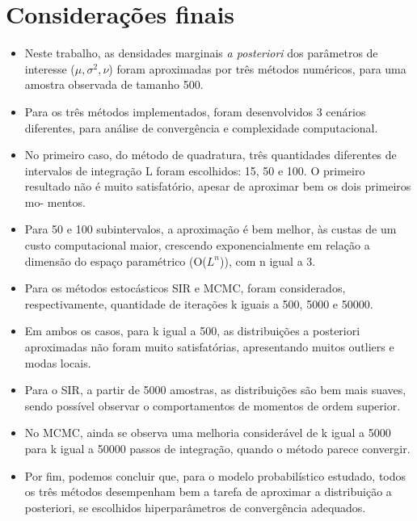 \documentclass[9pt]{beamer}
\begin{document}
\section{Considerações finais}
\begin{frame}
\begin{itemize}
\justifying	
\item Neste trabalho, as densidades marginais \textit{a posteriori} dos parâmetros de interesse ($\mu, \sigma^2, \nu$) foram aproximadas por três métodos numéricos, para uma amostra observada de tamanho 500.
\item Para os três métodos implementados, foram desenvolvidos 3 cenários diferentes, para análise
de convergência e complexidade computacional.
\item No primeiro caso, do método de quadratura,
três quantidades diferentes de intervalos de integração L foram escolhidos: 15, 50 e 100. O
primeiro resultado não é muito satisfatório, apesar de aproximar bem os dois primeiros mo-
mentos.	
\item Para 50 e 100 subintervalos, a aproximação é bem melhor, às custas de um custo
computacional maior, crescendo exponencialmente em relação a dimensão do espaço paramétrico (O($L^n$)), com n igual a 3.
\end{itemize}	
\end{frame}
\begin{frame}
\begin{itemize}
\justifying	
\item Para os métodos estocásticos SIR e MCMC, foram considerados,
respectivamente, quantidade de iterações k iguais a 500, 5000 e 50000.

\item Em ambos os casos, para k igual a 500, as distribuições a posteriori aproximadas não foram
muito satisfatórias, apresentando muitos outliers e modas locais.

\item Para o SIR, a partir de 5000
amostras, as distribuições são bem mais suaves, sendo possível observar o comportamentos de
momentos de ordem superior.

\item No MCMC, ainda se observa uma melhoria considerável de k
igual a 5000 para k igual a 50000 passos de integração, quando o método parece convergir.

\item Por fim, podemos concluir que, para o modelo probabilístico estudado, todos os três métodos
desempenham bem a tarefa de aproximar a distribuição a posteriori, se escolhidos hiperparâmetros de convergência adequados.
\end{itemize}	
\end{frame}
\end{document}
